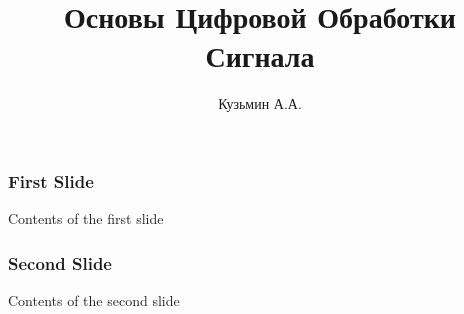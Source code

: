 \documentclass{beamer}
\title{Основы Цифровой Обработки Сигнала}
\author{Кузьмин А.А.}
\begin{document}
\maketitle
\begin{frame}
  \frametitle{First Slide}
  Contents of the first slide
\end{frame}
\begin{frame}
  \frametitle{Second Slide}
  Contents of the second slide
\end{frame}
\end{document}
